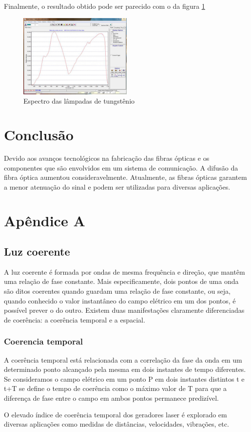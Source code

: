 \documentclass[article]{IEEEtran}
\begin{document}
Finalmente, o resultado obtido pode ser parecido com o da figura \ref{fig:resultado_espectrometro}

\begin{figure}[H]
	\includegraphics[width=0.5\textwidth]{images/resultado_espectrometro.jpg}
	\caption{Espectro das lâmpadas de tungstênio}
	\label{fig:resultado_espectrometro}
\end{figure} 

\section{Conclusão}
Devido aos avanços tecnológicos na fabricação das fibras ópticas e os componentes que são envolvidos em um sistema de comunicação. A difusão da fibra óptica aumentou consideravelmente. Atualmente, as fibras ópticas garantem a menor atenuação do sinal e podem ser utilizadas para diversas aplicações.
\clearpage
\appendix
\section{Apêndice A}
\subsection{Luz coerente}
\label{ap:l-coerente}
A luz coerente é formada por ondas de mesma frequência e direção, que mantêm uma relação de fase constante. Mais especificamente, dois pontos de uma onda são ditos coerentes quando guardam uma relação de fase constante, ou seja, quando conhecido o valor instantâneo do campo elétrico em um dos pontos, é possível prever o do outro. Existem duas manifestações claramente diferenciadas de coerência: a coerência temporal e a espacial.

\subsubsection{Coerencia temporal}
A coerência temporal está relacionada com a correlação da fase da onda em um determinado ponto alcançado pela mesma em dois instantes de tempo diferentes. Se consideramos o campo elétrico em um ponto P em dois instantes distintos t e t+T se define o tempo de coerência como o máximo valor de T para que a diferença de fase entre o campo em ambos pontos permanece predizível.
\par O elevado índice de coerência temporal dos geradores laser é explorado em diversas aplicações como medidas de distâncias, velocidades, vibrações, etc.
\end{document}

